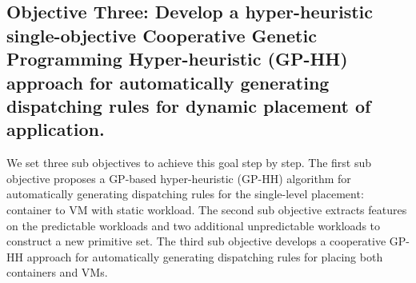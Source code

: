 \subsection{Objective Three: Develop a hyper-heuristic single-objective Cooperative Genetic Programming Hyper-heuristic (GP-HH) approach for automatically generating dispatching rules for dynamic placement of application.}

 We set three sub objectives to achieve this goal step by step. The first sub objective proposes a GP-based hyper-heuristic (GP-HH) algorithm for automatically generating dispatching rules for the single-level placement: container to VM with static workload. The second sub objective extracts features on the predictable workloads and two additional unpredictable workloads to construct a new primitive set. The third sub objective develops a cooperative GP-HH approach for automatically generating dispatching rules for placing both containers and VMs.



